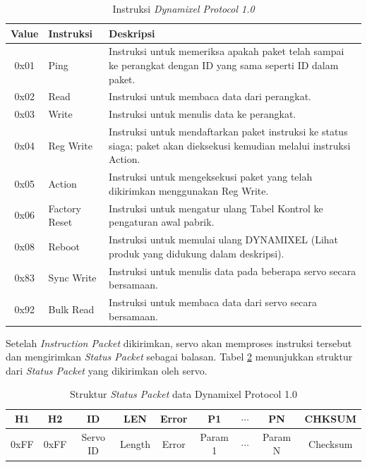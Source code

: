 \begin{table}[H]
\centering
\caption{Instruksi \emph{Dynamixel Protocol 1.0}}
\label{tab:Instruction}
\begin{tabular}{|c|l|p{8cm}|}
\hline
\textbf{Value} & \textbf{Instruksi} & \textbf{Deskripsi} \\
\hline
0x01 & Ping & Instruksi untuk memeriksa apakah paket telah sampai ke perangkat dengan ID yang sama seperti ID dalam paket. \\
\hline
0x02 & Read & Instruksi untuk membaca data dari perangkat. \\
\hline
0x03 & Write & Instruksi untuk menulis data ke perangkat. \\
\hline
0x04 & Reg Write & Instruksi untuk mendaftarkan paket instruksi ke status siaga; paket akan dieksekusi kemudian melalui instruksi Action. \\
\hline
0x05 & Action & Instruksi untuk mengeksekusi paket yang telah dikirimkan menggunakan Reg Write. \\
\hline
0x06 & Factory Reset & Instruksi untuk mengatur ulang Tabel Kontrol ke pengaturan awal pabrik. \\
\hline
0x08 & Reboot & Instruksi untuk memulai ulang DYNAMIXEL (Lihat produk yang didukung dalam deskripsi). \\
\hline
0x83 & Sync Write & Instruksi untuk menulis data pada beberapa servo secara bersamaan. \\
\hline
0x92 & Bulk Read & Instruksi untuk membaca data dari servo secara bersamaan. \\
\hline
\end{tabular}
\end{table}

Setelah \emph{Instruction Packet} dikirimkan, servo akan memproses instruksi tersebut
dan mengirimkan \emph{Status Packet} sebagai balasan. Tabel \ref{tab:StatusPacket}
menunjukkan struktur dari \emph{Status Packet} yang dikirimkan oleh servo.
\begin{table}[H]
\centering
\caption{Struktur \emph{Status Packet} data Dynamixel Protocol 1.0}
\label{tab:StatusPacket}
\renewcommand{\arraystretch}{1.5}
\begin{tabular}{|c|c|c|c|c|c|c|c|c|}
  \hline
  \textbf{H1} & \textbf{H2} & \textbf{ID} & \textbf{LEN} & \textbf{Error} & \textbf{P1} & \textbf{$\cdots$} & \textbf{PN} & \textbf{CHKSUM} \\
  \hline
  0xFF & 0xFF & Servo ID & Length & Error & Param 1 & $\cdots$ & Param N & Checksum \\
  \hline
\end{tabular}
\end{table}

